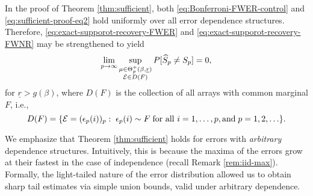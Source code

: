 \begin{remark} \label{rmk:sufficient-strengthened}
In the proof of Theorem \ref{thm:sufficient}, both \eqref{eq:Bonferroni-FWER-control} and \eqref{eq:sufficient-proof-eq2} hold uniformly over all error dependence structures.
Therefore, \eqref{eq:exact-supporot-recovery-FWER} and \eqref{eq:exact-supporot-recovery-FWNR} may be strengthened to yield
\begin{equation} \label{eq:exact-supporot-recovery-strengthened}
    \lim_{p\to\infty}\sup_{\substack{\mu\in\Theta_p^+(\beta, \underline{r})\\ {\cal E}\in D(F)}} P[\widehat{S}_p \neq S_p] = 0,
\end{equation}
for $\underline{r} > g(\beta)$, where $D(F)$ is the collection of all arrays with common marginal $F$, i.e., 
\begin{equation} \label{eq:common-marginal-distribution}
    D(F)=\{{\cal E}=(\epsilon_p(i))_p:\;\epsilon_p(i)\sim F\;\text{for all }i=1,\ldots,p, \text{and}\; p=1,2,\ldots\}.
\end{equation}
\end{remark}

\begin{remark}
We emphasize that Theorem \ref{thm:sufficient} holds for errors with \emph{arbitrary} dependence structures. 
Intuitively, this is because the maxima of the errors grow at their fastest in the case of independence (recall Remark \ref{rem:iid-max}). 
Formally, the light-tailed nature of the error distribution allowed us to obtain sharp tail estimates via simple union bounds, 
valid under arbitrary dependence.
\end{remark}


